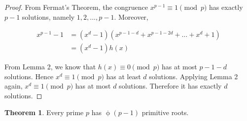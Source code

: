 \documentclass{article}
\theoremstyle{definition} %
\newtheorem{theorem}{Theorem}[section] %
\theoremstyle{definition}
\theoremstyle{definition}
\newcommand{\tot}{\upphi}
\theoremstyle{definition}
\begin{document}
  \begin{proof}
    From Fermat's Theorem, the congruence $x^{p - 1} \equiv 1 \pmod{p}$ has exactly
    $p - 1$ solutions, namely $1, 2, ..., p - 1$. Moreover,
    
    \begin{align*}
      x^{p - 1} - 1 &= (x^d - 1)(x^{p-1-d}+x^{p-1-2d}+\dots + x^d+1) \\
        &= (x^d - 1)h(x)
    \end{align*}
    
    From Lemma 2, we know that $h(x) \equiv 0 \pmod{p}$ has at most $p - 1 - d$
    solutions. Hence $x^d \equiv 1 \pmod{p}$ has at least $d$ solutions.
    Applying Lemma 2 again, $x^d \equiv 1 \pmod{p}$ has at most $d$ solutions.
    Therefore it has exactly $d$ solutions.
  \end{proof}
  
  \begin{theorem}
    Every prime $p$ has $\tot(p - 1)$ primitive roots.
  \end{theorem}
  
\end{document}
